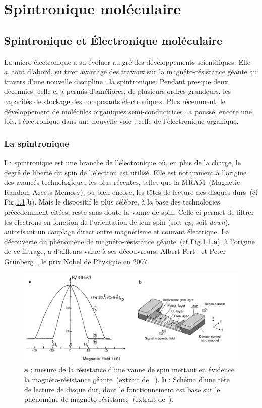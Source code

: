 \chapter{Spintronique moléculaire}

\section{Spintronique et Électronique moléculaire}
La micro-électronique a su évoluer au gré des développements scientifiques. Elle a, tout d'abord, su tirer avantage des travaux sur la magnéto-résistance géante au travers d'une nouvelle discipline : la spintronique. Pendant presque deux décennies, celle-ci a permis d'améliorer, de plusieurs ordres grandeurs, les capacités de stockage des composants électroniques. Plus récemment, le développement de molécules organiques semi-conductrices~\cite{Tsumura1986,Horowitz1990,Lin1997} a poussé, encore une fois, l'électronique dans une nouvelle voie : celle de l'électronique organique.

\subsection{La spintronique}
La spintronique est une branche de l'électronique où, en plus de la charge, le degré de liberté du spin de l'électron est utilisé. Elle est notamment à l'origine des avancés technologiques les plus récentes, telles que la MRAM~(Magnetic Random Access Memory), ou bien encore, les têtes de lecture des disques durs~(cf Fig.\ref{SpinValve}.\textbf{b}). Mais le dispositif le plus célèbre, à la base des technologies précédemment citées, reste sans doute la vanne de spin. Celle-ci permet de filtrer les électrons en fonction de l'orientation de leur spin (soit \textit{up}, soit \textit{down}), autorisant un couplage direct entre magnétisme et courant électrique. La découverte du phénomène de magnéto-résistance géante~(cf Fig.\ref{SpinValve}.\textbf{a}), à l'origine de ce filtrage, a d'ailleurs value à ses découvreurs, Albert Fert~\cite{Baibich1988} et Peter Grünberg~\cite{Gruenberg1986}, le prix Nobel de Physique en 2007.

\begin{figure}
\centering \includegraphics[scale=0.45]{Spintronique/SpinValve/SpinValve.pdf}
\caption{\textbf{a} : mesure de la résistance d'une vanne de spin mettant en évidence la magnéto-résistance géante~(extrait de ~\cite{Baibich1988}).  \textbf{b} : Schéma d'une tête de lecture de disque dur, dont le fonctionnement est basé sur le phénomène de magnéto-résistance~(extrait de~\cite{Hitoshi2001}).}
\label{SpinValve}
\end{figure}



